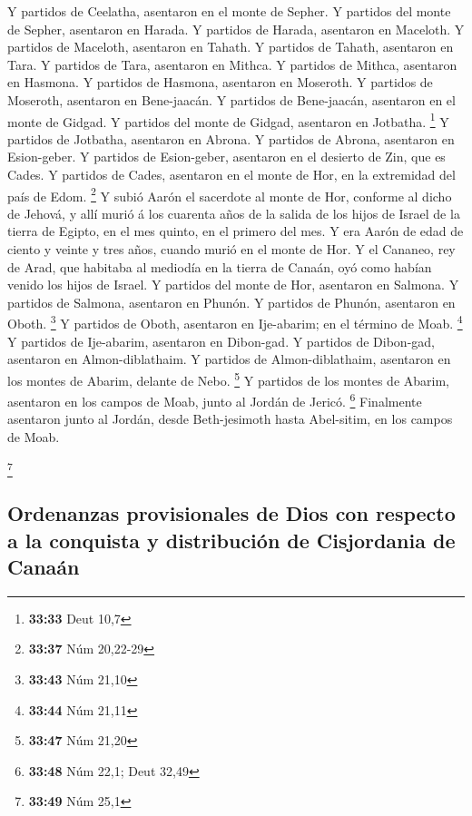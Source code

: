  Y partidos de Ceelatha, asentaron en el monte de Sepher.
 Y partidos del monte de Sepher, asentaron en Harada.
 Y partidos de Harada, asentaron en Maceloth.
 Y partidos de Maceloth, asentaron en Tahath.
 Y partidos de Tahath, asentaron en Tara. 
Y partidos de Tara, asentaron en Mithca.  Y partidos de
Mithca, asentaron en Hasmona.  Y partidos de Hasmona,
asentaron en Moseroth.  Y partidos de Moseroth, asentaron
en Bene-jaacán.  Y partidos de Bene-jaacán, asentaron en
el monte de Gidgad.  Y partidos del monte de Gidgad,
asentaron en Jotbatha. \footnote{\textbf{33:33} Deut 10,7}
 Y partidos de Jotbatha, asentaron en Abrona.
 Y partidos de Abrona, asentaron en Esion-geber.
 Y partidos de Esion-geber, asentaron en el desierto de
Zin, que es Cades.  Y partidos de Cades, asentaron en el
monte de Hor, en la extremidad del país de Edom. \footnote{\textbf{33:37}
  Núm 20,22-29}  Y subió Aarón el sacerdote al monte de
Hor, conforme al dicho de Jehová, y allí murió á los cuarenta años de la
salida de los hijos de Israel de la tierra de Egipto, en el mes quinto,
en el primero del mes.  Y era Aarón de edad de ciento y
veinte y tres años, cuando murió en el monte de Hor.  Y
el Cananeo, rey de Arad, que habitaba al mediodía en la tierra de
Canaán, oyó como habían venido los hijos de Israel.  Y
partidos del monte de Hor, asentaron en Salmona.  Y
partidos de Salmona, asentaron en Phunón.  Y partidos de
Phunón, asentaron en Oboth. \footnote{\textbf{33:43} Núm 21,10}
 Y partidos de Oboth, asentaron en Ije-abarim; en el
término de Moab. \footnote{\textbf{33:44} Núm 21,11}  Y
partidos de Ije-abarim, asentaron en Dibon-gad.  Y
partidos de Dibon-gad, asentaron en Almon-diblathaim.  Y
partidos de Almon-diblathaim, asentaron en los montes de Abarim, delante
de Nebo. \footnote{\textbf{33:47} Núm 21,20}  Y partidos
de los montes de Abarim, asentaron en los campos de Moab, junto al
Jordán de Jericó. \footnote{\textbf{33:48} Núm 22,1; Deut 32,49}
 Finalmente asentaron junto al Jordán, desde
Beth-jesimoth hasta Abel-sitim, en los campos de Moab.

\footnote{\textbf{33:49} Núm 25,1}

\hypertarget{ordenanzas-provisionales-de-dios-con-respecto-a-la-conquista-y-distribuciuxf3n-de-cisjordania-de-canauxe1n}{%
\subsection{Ordenanzas provisionales de Dios con respecto a la conquista
y distribución de Cisjordania de
Canaán}\label{ordenanzas-provisionales-de-dios-con-respecto-a-la-conquista-y-distribuciuxf3n-de-cisjordania-de-canauxe1n}}

